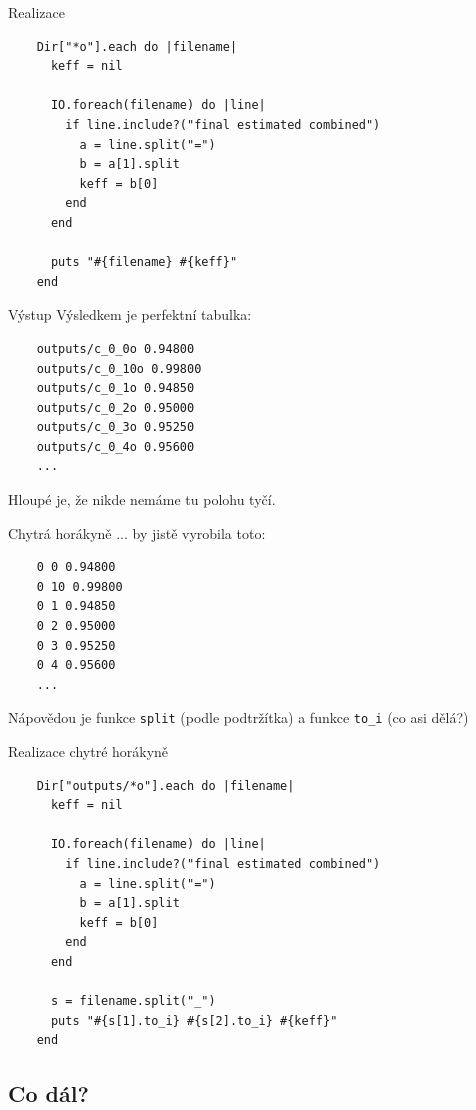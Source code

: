 \documentclass{beamer}
\begin{document}
\begin{frame}[fragile]{Realizace}
  \scriptsize
  \begin{verbatim}
    Dir["*o"].each do |filename|
      keff = nil

      IO.foreach(filename) do |line|
        if line.include?("final estimated combined")
          a = line.split("=")
          b = a[1].split
          keff = b[0]
        end
      end

      puts "#{filename} #{keff}"
    end
  \end{verbatim}
\end{frame}

\begin{frame}[fragile]{Výstup}
  Výsledkem je perfektní tabulka:
  {\scriptsize
  \begin{verbatim}
    outputs/c_0_0o 0.94800
    outputs/c_0_10o 0.99800
    outputs/c_0_1o 0.94850
    outputs/c_0_2o 0.95000
    outputs/c_0_3o 0.95250
    outputs/c_0_4o 0.95600
    ...
  \end{verbatim}}
  Hloupé je, že nikde nemáme tu polohu tyčí.
\end{frame}


\begin{frame}[fragile]{Chytrá horákyně}
  ... by jistě vyrobila toto:
  {\scriptsize
  \begin{verbatim}
    0 0 0.94800
    0 10 0.99800
    0 1 0.94850
    0 2 0.95000
    0 3 0.95250
    0 4 0.95600
    ...
  \end{verbatim}
  }
  Nápovědou je funkce \texttt{split} (podle podtržítka) a funkce \texttt{to\_i} (co asi dělá?)
\end{frame}

\begin{frame}[fragile]{Realizace chytré horákyně}
  \scriptsize
  \begin{verbatim}
    Dir["outputs/*o"].each do |filename|
      keff = nil

      IO.foreach(filename) do |line|
        if line.include?("final estimated combined")
          a = line.split("=")
          b = a[1].split
          keff = b[0]
        end
      end

      s = filename.split("_")
      puts "#{s[1].to_i} #{s[2].to_i} #{keff}"
    end
  \end{verbatim}
\end{frame}

\subsection{Co dál?}
\end{document}

